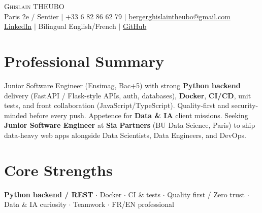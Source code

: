 \documentclass[letterpaper,10.5pt]{article}
\begin{document}
\begin{center}
{\Huge \scshape Ghislain THEUBO} \\ \vspace{2pt}
\small Paris 2e / Sentier $|$ +33 6 82 86 62 79 $|$ \href{mailto:bergerghislaintheubo@gmail.com}{bergerghislaintheubo@gmail.com} \\
\href{https://www.linkedin.com/in/berger-ghislain}{LinkedIn} $|$ Bilingual English/French $|$ \href{https://github.com/Bergerghislain}{GitHub}
\end{center}
\vspace{-6pt}
\section{Professional Summary}
\small{Junior Software Engineer (Ensimag, Bac+5) with strong \textbf{Python backend} delivery (FastAPI / Flask-style APIs, auth, databases), \textbf{Docker}, \textbf{CI/CD}, unit tests, and front collaboration (JavaScript/TypeScript). Quality-first and security-minded before every push. Appetence for \textbf{Data \& IA} client missions. Seeking \textbf{Junior Software Engineer} at \textbf{Sia Partners} (BU Data Science, Paris) to ship data-heavy web apps alongside Data Scientists, Data Engineers, and DevOps.}
\section{Core Strengths}
\small{\textbf{Python backend / REST} $\cdot$ Docker $\cdot$ CI \& tests $\cdot$ Quality first / Zero trust $\cdot$ Data \& IA curiosity $\cdot$ Teamwork $\cdot$ FR/EN professional}
\end{document}
